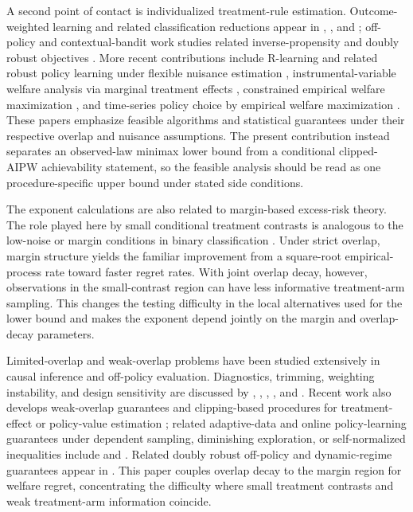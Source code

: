 A second point of contact is individualized treatment-rule estimation.  Outcome-weighted learning and related classification reductions appear in \citet{Qian2011}, \citet{Zhao2012}, and \citet{Zhang2012}; off-policy and contextual-bandit work studies related inverse-propensity and doubly robust objectives \citep{Dudik2011,Swaminathan2015,Kallus2017}.  More recent contributions include R-learning and related robust policy learning under flexible nuisance estimation \citep{Nie2021,Athey2021}, instrumental-variable welfare analysis via marginal treatment effects \citep{Sasaki2020}, constrained empirical welfare maximization \citep{Sun2021}, and time-series policy choice by empirical welfare maximization \citep{Kitagawa2022}.  These papers emphasize feasible algorithms and statistical guarantees under their respective overlap and nuisance assumptions.  The present contribution instead separates an observed-law minimax lower bound from a conditional clipped-AIPW achievability statement, so the feasible analysis should be read as one procedure-specific upper bound under stated side conditions.

The exponent calculations are also related to margin-based excess-risk theory.  The role played here by small conditional treatment contrasts is analogous to the low-noise or margin conditions in binary classification \citep{Audibert2007,Massart2006,Tsybakov2009}.  Under strict overlap, margin structure yields the familiar improvement from a square-root empirical-process rate toward faster regret rates.  With joint overlap decay, however, observations in the small-contrast region can have less informative treatment-arm sampling.  This changes the testing difficulty in the local alternatives used for the lower bound and makes the exponent depend jointly on the margin and overlap-decay parameters.

Limited-overlap and weak-overlap problems have been studied extensively in causal inference and off-policy evaluation.  Diagnostics, trimming, weighting instability, and design sensitivity are discussed by \citet{Li2016}, \citet{DAmour2017}, \citet{BenMichael2022}, \citet{Hill2024}, and \citet{Susmann2025}.  Recent work also develops weak-overlap guarantees and clipping-based procedures for treatment-effect or policy-value estimation \citep{Zhao2023,Liu2026}; related adaptive-data and online policy-learning guarantees under dependent sampling, diminishing exploration, or self-normalized inequalities include \citet{Zhan2021} and \citet{Girard2025}.
Related doubly robust off-policy and dynamic-regime guarantees appear in \citet{Chen2020,Sakaguchi2024}.  This paper couples overlap decay to the margin region for welfare regret, concentrating the difficulty where small treatment contrasts and weak treatment-arm information coincide.

